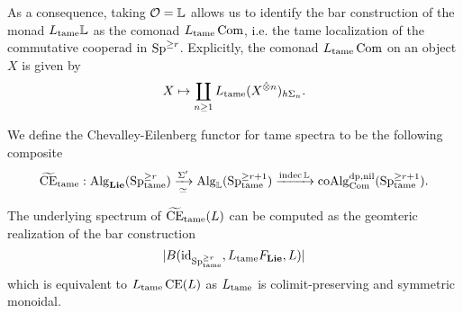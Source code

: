 As a consequence, taking $\CO=\BL$ allows us to identify the bar construction of the monad $L_{\tame}\BL$ as the comonad $L_{\tame}\Com$, i.e. the tame localization of the commutative cooperad in $\Sp^{\geq r}$. Explicitly, the comonad $L_{\tame}\Com$ on an object $X$ is given by
$$
X \mapsto \coprod_{n\geq 1} L_{\tame} (X^{\hat{\otimes} n})_{h\Sigma_n}.
$$

\begin{definition}
\label{Chevalley-Eilenberg functor for tame spectra}
We define the Chevalley-Eilenberg functor for tame spectra
to be the following composite
$$
\tildeCE_{\tame}: \Alg_{\spLie}(\Sp^{\geq r}_{\tame})
\xrightarrow[\simeq]{\Sigma'}
\Alg_{\BL}(\Sp^{\geq r+1}_{\tame})
\xrightarrow{\indec{\BL}}
\coAlg^{\divpow, \nil}_{\Com}(\Sp^{\geq r+1}_{\tame}).
$$
\end{definition}



\begin{remark}
\label{Formula for computing CE_tame(L)}
The underlying spectrum of $\tildeCE_{\tame}(L)$ can be computed as the geomteric realization of the bar construction 
$$
|B(\id_{\Sp^{\geq r}_{\tame}}, L_{\tame}F_{\spLie}, L )|
$$
which is equivalent to $L_{\tame}\operatorname{CE}(L)$ as $L_{\tame}$ is colimit-preserving and symmetric monoidal.
\end{remark}



